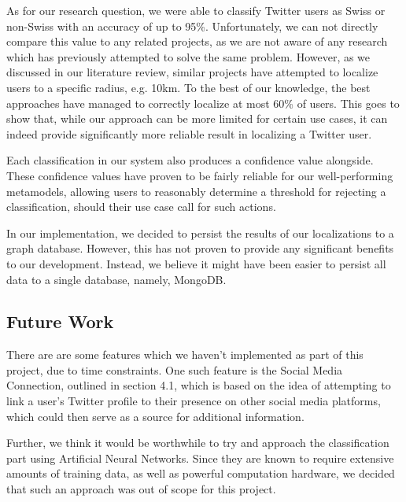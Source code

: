 \documentclass[10pt,a4paper]{article}
\begin{document}
As for our research question, we were able to classify Twitter users as Swiss or non-Swiss with an accuracy of up to 95\%. Unfortunately, we can not directly compare this value to any related projects, as we are not aware of any research which has previously attempted to solve the same problem. However, as we discussed in our literature review, similar projects have attempted to localize users to a specific radius, e.g. 10km. To the best of our knowledge, the best approaches have managed to correctly localize at most 60\% of users. This goes to show that, while our approach can be more limited for certain use cases, it can indeed provide significantly more reliable result in localizing a Twitter user.

Each classification in our system also produces a confidence value alongside. These confidence values have proven to be fairly reliable for our well-performing metamodels, allowing users to reasonably determine a threshold for rejecting a classification, should their use case call for such actions.

In our implementation, we decided to persist the results of our localizations to a graph database. However, this has not proven to provide any significant benefits to our development. Instead, we believe it might have been easier to persist all data to a single database, namely, MongoDB.

\subsection{Future Work}
There are are some features which we haven't implemented as part of this project, due to time constraints. One such feature is the Social Media Connection, outlined in section 4.1, which is based on the idea of attempting to link a user's Twitter profile to their presence on other social media platforms, which could then serve as a source for additional information.

Further, we think it would be worthwhile to try and approach the classification part using Artificial Neural Networks. Since they are known to require extensive amounts of training data, as well as powerful computation hardware, we decided that such an approach was out of scope for this project.
\end{document}

